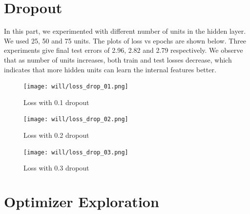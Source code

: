 \documentclass{article}
\begin{document}
 \newpage
\section{Dropout}
In this part, we experimented with different number of units in the hidden layer. We used 25, 50 and 75 units. The plots of loss vs epochs are shown below. Three experiments give final test errors of 2.96, 2.82 and 2.79 respectively. We observe that as number of units increases, both train and test losses decrease, which indicates that more hidden units can learn the internal features better.

\begin{figure}[h]
\centering
\texttt{[image: will/loss\_drop\_01.png]}
\caption{Loss with 0.1 dropout}
\end{figure}
\begin{figure}[h]
\centering
\texttt{[image: will/loss\_drop\_02.png]}
\caption{Loss with 0.2 dropout}
\end{figure}
\begin{figure}[h]
\centering
\texttt{[image: will/loss\_drop\_03.png]}
\caption{Loss with 0.3 dropout}
\end{figure}
\newpage
\section{Optimizer Exploration}
\end{document}
